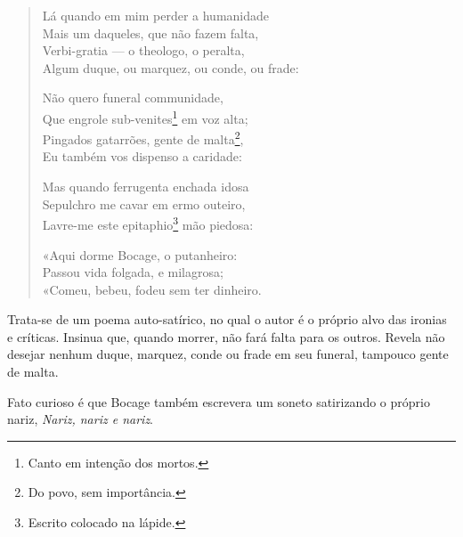\begin{verse}
Lá quando em mim perder a humanidade \\
Mais um daqueles, que não fazem falta, \\
Verbi-gratia — o theologo, o peralta, \\
Algum duque, ou marquez, ou conde, ou frade:
				
Não quero funeral communidade, \\
Que engrole sub-venites\footnote{Canto em intenção dos mortos.} em voz alta; \\
Pingados gatarrões, gente de malta\footnote{Do povo, sem importância.}, \\
Eu também vos dispenso a caridade:
				
Mas quando ferrugenta enchada idosa \\
Sepulchro me cavar em ermo outeiro, \\
Lavre-me este epitaphio\footnote{Escrito colocado na lápide.} mão piedosa:
				
«Aqui dorme Bocage, o putanheiro: \\
Passou vida folgada, e milagrosa; \\
«Comeu, bebeu, fodeu sem ter dinheiro.
\end{verse}

Trata-se de um poema auto-satírico, no qual o autor é o próprio alvo das ironias e críticas. Insinua que, quando morrer, não fará falta para os outros. Revela não desejar nenhum duque, marquez, conde ou frade em seu funeral, tampouco gente de malta.

Fato curioso é que Bocage também escrevera um soneto satirizando o próprio nariz, \textit{Nariz, nariz e nariz}.